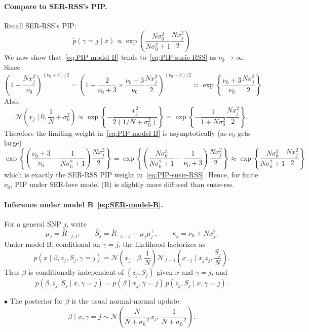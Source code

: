 \documentclass[11pt]{article}
\newcommand{\Normal}{\mathcal N}
\begin{document}
\paragraph{Compare to SER-RSS's PIP.} Recall SER-RSS's PIP:
\begin{equation}\label{eq:PIP-susie-RSS}
\tilde{p}(\gamma=j\mid x)
\propto \exp\left(\dfrac{N\sigma_0^{2}}{N\sigma_0^{2} + 1} \dfrac{N x_j^2}{2} \right)
\end{equation}
We now show that~\eqref{eq:PIP-model-B} tends to~\eqref{eq:PIP-susie-RSS}
as $\nu_0\to\infty$. Since
\[
\left(1+\frac{Nx_j^2}{\nu_0}\right)^{(\nu_0+3)/2} = \left(1+ \dfrac{2}{\nu_0 + 3} \times \dfrac{\nu_0 + 3}{\nu_0} \frac{Nx_j^2}{2}\right)^{(\nu_0+3)/2} 
\asymp \exp\left\{\frac{\nu_0 + 3}{\nu_0} \dfrac{Nx_j^2}{2}\right\}
\]
Also,
\[
\Normal\left(x_j\mid 0,\frac{1}{N}+\sigma_0^2\right)
\propto
\exp\left\{
-\frac{x_j^2}{2(1/N+\sigma_0^2)}
\right\}
=
\exp\left\{
-\frac{1}{1+N\sigma_0^2} \frac{N x_j^2}{2}
\right\}.
\]
Therefore the limiting weight in~\eqref{eq:PIP-model-B} is asymptotically (as $\nu_0$ gets large)
\[
\exp\left\{\left(\frac{\nu_0 + 3}{\nu_0} - \dfrac{1}{N\sigma_0^2 + 1}\right) \dfrac{Nx_j^2}{2}\right\} = \exp\left\{\left(\dfrac{N\sigma_0^2}{N\sigma_0^2 + 1} - \dfrac{1}{\nu_0 + 3}\right) \dfrac{Nx_j^2}{2}\right\} \approx \exp\left\{\dfrac{N\sigma_0^2}{N\sigma_0^2 + 1} \dfrac{Nx_j^2}{2}\right\}
\]
which is exactly the SER-RSS PIP weight in~\eqref{eq:PIP-susie-RSS}. Hence, for finite $\nu_0$, PIP under SER-love model (B) is slightly more diffused than susie-rss. 

\paragraph{Inference under model B~\eqref{eq:SER-model-B}.}
For a general SNP $j$, write
\[
\mu_j=\bar R_{-j,j},
\qquad
\bar S_j=\bar R_{-j,-j}-\mu_j\mu_j^\top,
\qquad
\kappa_j=\nu_0+Nx_j^2.
\]
Under model B, conditional on $\gamma=j$, the likelihood factorizes as
\[
p(x\mid \beta,z_j,S_j,\gamma=j)
=
\Normal\left(x_j\mid \beta,\frac{1}{N}\right)
\Normal_{J-1}\left(x_{-j}\mid x_jz_j,\frac{S_j}{N}\right).
\]
Thus $\beta$ is conditionally independent of $(z_j,S_j)$ given $x$ and
$\gamma=j$, and
\[
p(\beta,z_j,S_j\mid x,\gamma=j)
=
p(\beta\mid x_j,\gamma=j)\,
p(z_j,S_j\mid x,\gamma=j).
\]

$\bullet$ The posterior for $\beta$ is the usual normal-normal update:
\[
\boxed{
\beta\mid x,\gamma=j
\sim
\Normal\left(
\frac{N}{N+\sigma_0^{-2}}x_j,\,
\frac{1}{N+\sigma_0^{-2}}
\right).
}
\]
\end{document}
